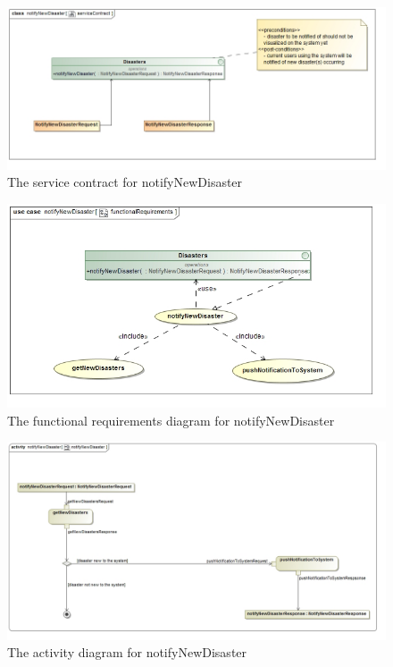  \begin{figure}[H]
	\centering
	\includegraphics[width=1.0\textwidth]{../images/funcReq/notifyNewDisasterServiceContract.jpg}
	\caption{The service contract for notifyNewDisaster \label{overflow}}
\end{figure}

\begin{figure}[H]
	\centering
	\includegraphics[width=1.0\textwidth]{../images/funcReq/notifyNewDisasterFunctionalRequirements.jpg}
	\caption{The functional requirements diagram for notifyNewDisaster \label{overflow}}
\end{figure}

\begin{figure}[H]
	\centering
	\includegraphics[width=1.0\textwidth]{../images/funcReq/notifyNewDisasterActivityDiagram.jpg}
	\caption{The activity diagram for notifyNewDisaster \label{overflow}}
\end{figure} 

